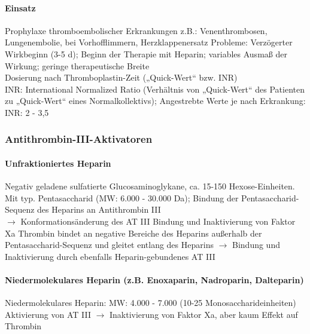 \documentclass[10pt,a4paper]{report}
\begin{document}
\paragraph{Einsatz} %
\label{par:einsatz}
Prophylaxe thromboembolischer Erkrankungen z.B.: 	Venenthrombosen, Lungenembolie, bei Vorhofflimmern, Herzklappenersatz Probleme: Verzögerter Wirkbeginn (3-5 d); Beginn der Therapie mit Heparin; variables Ausmaß der Wirkung; geringe therapeutische Breite\\
 Dosierung nach Thromboplastin-Zeit („Quick-Wert“ bzw. INR)\\
INR: International Normalized Ratio (Verhältnis von „Quick-Wert“ des Patienten zu „Quick-Wert“ eines Normalkollektivs); Angestrebte Werte je nach Erkrankung:	 INR:	 2 - 3,5
\subsubsection{Antithrombin-III-Aktivatoren} %
\label{ssub:antithrombin_iii_aktivatoren}
\paragraph{Unfraktioniertes Heparin} %
\label{par:unfraktioniertes_heparin}
Negativ geladene sulfatierte Glucosaminoglykane, ca. 15-150 Hexose-Einheiten. Mit typ. Pentasaccharid (MW: 6.000 - 30.000 Da); Bindung der Pentasaccharid-Sequenz des Heparins an Antithrombin III \\
$\rightarrow$ Konformationsänderung des AT III Bindung und Inaktivierung von Faktor Xa Thrombin bindet an negative Bereiche des Heparins außerhalb der Pentasaccharid-Sequenz und gleitet entlang des Heparins $\rightarrow$ Bindung und Inaktivierung durch ebenfalls Heparin-gebundenes AT III 
\paragraph{Niedermolekulares Heparin (z.B. Enoxaparin, Nadroparin, Dalteparin)} %
\label{par:niedermolekulares_heparin_z_b_enoxaparin_nadroparin_dalteparin_}
Niedermolekulares Heparin: MW: 4.000 - 7.000 (10-25 Monosaccharideinheiten) Aktivierung von AT III  $\rightarrow$ Inaktivierung von Faktor Xa, aber kaum Effekt auf Thrombin
\end{document}
